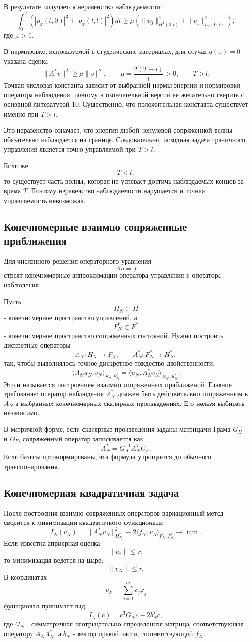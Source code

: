 \documentclass[12pt,a4paper]{article}
\begin{document}
В результате получается неравенство наблюдаемости:
\[
 \int_0^T\left(|p_x(t,0)|^2+|p_x(t,l)|^2\right)dt
 \ge
 \mu\left(\|v_0\|_{H_0^1(0,l)}^2+\|v_1\|_{L_2(0,l)}^2\right),
\]
где $\mu>0$.

В нормировке, используемой в студенческих материалах, для случая $q(x)=0$ указана оценка
\[
 \|A^*v\|^2\ge \mu\|v\|^2,
 \qquad
 \mu=\frac{2(T-l)}{l}>0,
 \qquad T>l.
\]
Точная числовая константа зависит от выбранной нормы энергии и нормировки оператора наблюдения, поэтому в окончательной версии ее желательно сверить с основной литературой 10. Существенно, что положительная константа существует именно при $T>l$.

Это неравенство означает, что энергия любой ненулевой сопряженной волны обязательно наблюдается на границе. Следовательно, исходная задача граничного управления является точно управляемой при $T>l$.

Если же
\[
 T<l,
\]
то существует часть волны, которая не успевает достичь наблюдаемых концов за время $T$. Поэтому неравенство наблюдаемости нарушается и точная управляемость невозможна.

\subsection*{Конечномерные взаимно сопряженные приближения}
Для численного решения операторного уравнения
\[
 Au=f
\]
строят конечномерные аппроксимации оператора управления и оператора наблюдения.

Пусть
\[
 H_N\subset H
\]
- конечномерное пространство управлений, а
\[
 F_N^*\subset F^*
\]
- конечномерное пространство сопряженных состояний. Нужно построить дискретные операторы
\[
 A_N:H_N\to F_N,
 \qquad
 A_N^*:F_N^*\to H_N^*,
\]
так, чтобы выполнялось точное дискретное тождество двойственности:
\[
 \langle A_Nu_N,v_N\rangle_{F_N,F_N^*}
 =
 \langle u_N,A_N^*v_N\rangle_{H_N,H_N^*}.
\]
Это и называется построением взаимно сопряженных приближений. Главное требование: оператор наблюдения $A_N^*$ должен быть действительно сопряженным к $A_N$ в выбранных конечномерных скалярных произведениях. Его нельзя выбирать независимо.

В матричной форме, если скалярные произведения заданы матрицами Грама $G_H$ и $G_F$, сопряженный оператор записывается как
\[
 A_N^*=G_H^{-1}A_N^T G_F.
\]
Если базисы ортонормированы, эта формула упрощается до обычного транспонирования.

\subsection*{Конечномерная квадратичная задача}
После построения взаимно сопряженных операторов вариационный метод сводится к минимизации квадратичного функционала:
\[
 I_N(v_N)=\|A_N^*v_N\|_{H_N^*}^2
 -2\langle f_N,v_N\rangle_{F_N,F_N^*}
 \to\min.
\]
Если известна априорная оценка
\[
 \|v_*\|\le r,
\]
то минимизация ведется на шаре:
\[
 \|v_N\|\le r.
\]
В координатах
\[
 v_N=\sum_{j=1}^m c_j\varphi_j
\]
функционал принимает вид
\[
 I_N(c)=c^TG_Nc-2b_N^Tc,
\]
где $G_N$ - симметричная неотрицательно определенная матрица, соответствующая оператору $A_NA_N^*$, а $b_N$ - вектор правой части, соответствующий $f_N$.
\end{document}
